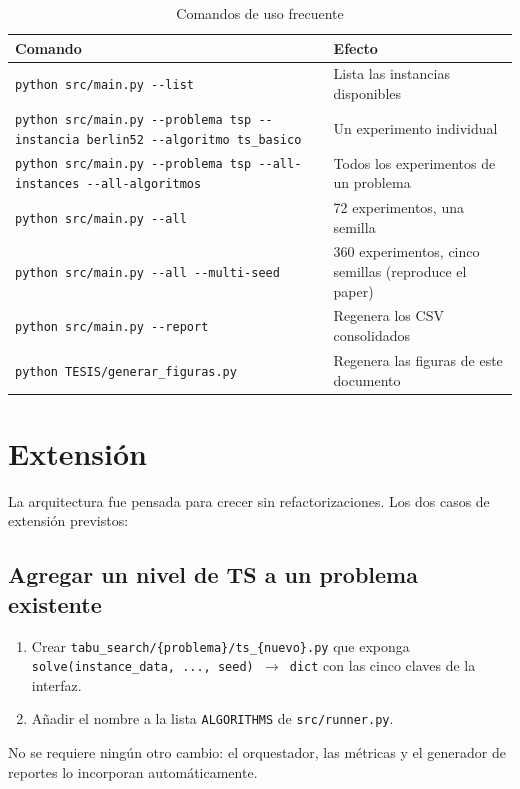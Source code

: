 \begin{table}[H]
\centering
\caption{Comandos de uso frecuente}
\label{tab:comandos}
\small
\begin{tabular}{p{7.5cm}p{6cm}}
\toprule
\textbf{Comando} & \textbf{Efecto} \\
\midrule
\texttt{python src/main.py -{}-list} &
  Lista las instancias disponibles \\
\texttt{python src/main.py -{}-problema tsp -{}-instancia berlin52
  -{}-algoritmo ts\_basico} &
  Un experimento individual \\
\texttt{python src/main.py -{}-problema tsp -{}-all-instances
  -{}-all-algoritmos} &
  Todos los experimentos de un problema \\
\texttt{python src/main.py -{}-all} &
  72 experimentos, una semilla \\
\texttt{python src/main.py -{}-all -{}-multi-seed} &
  360 experimentos, cinco semillas (reproduce el paper) \\
\texttt{python src/main.py -{}-report} &
  Regenera los CSV consolidados \\
\texttt{python TESIS/generar\_figuras.py} &
  Regenera las figuras de este documento \\
\bottomrule
\end{tabular}
\end{table}

\section{Extensión}

La arquitectura fue pensada para crecer sin refactorizaciones. Los dos casos
de extensión previstos:

\subsection{Agregar un nivel de TS a un problema existente}

\begin{enumerate}
  \item Crear \texttt{tabu\_search/\{problema\}/ts\_\{nuevo\}.py} que exponga
    \texttt{solve(instance\_data, ..., seed) $\rightarrow$ dict} con las
    cinco claves de la interfaz.
  \item Añadir el nombre a la lista \texttt{ALGORITHMS} de
    \texttt{src/runner.py}.
\end{enumerate}

No se requiere ningún otro cambio: el orquestador, las métricas y el
generador de reportes lo incorporan automáticamente.


